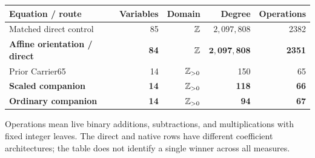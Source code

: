 \begin{center}\small
\begin{tabular}{lrrrr}\toprule
Equation / route&Variables&Domain&Degree&Operations\\\midrule
Matched direct control&85&$\mathbb Z$&$2{,}097{,}808$&2382\\
\textbf{Affine orientation / direct}&\textbf{84}&$\mathbb Z$&$\mathbf{2{,}097{,}808}$&\textbf{2351}\\
Prior Carrier65&14&$\mathbb Z_{>0}$&150&65\\
\textbf{Scaled companion}&\textbf{14}&$\mathbb Z_{>0}$&\textbf{118}&\textbf{66}\\
\textbf{Ordinary companion}&\textbf{14}&$\mathbb Z_{>0}$&\textbf{94}&\textbf{67}\\\bottomrule
\end{tabular}
\end{center}
Operations mean live binary additions, subtractions, and multiplications with fixed integer leaves. The direct and native rows have different coefficient architectures; the table does not identify a single winner across all measures.
